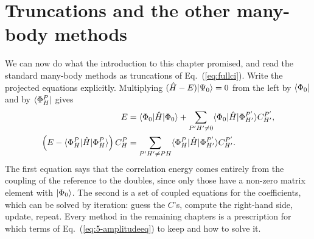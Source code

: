 \section{Truncations and the other many-body methods}
\label{sec:citruncationmap}

We can now do what the introduction to this chapter promised, and read the
standard many-body methods as truncations of Eq.~(\ref{eq:fullci}).  Write the
projected equations explicitly.  Multiplying
$(\hat{H}-E)\vert \Psi_0 \rangle=0$ from the left by $\langle \Phi_0 \vert$ and by
$\langle \Phi_H^P \vert$ gives
\begin{align}
  E &= \langle \Phi_0 | \hat{H} | \Phi_0 \rangle
    + \sum_{P'H'\ne 0}\langle \Phi_0 | \hat{H} | \Phi_{H'}^{P'} \rangle C_{H'}^{P'},
  \label{eq:5-energyeq}\\
  \left(E - \langle \Phi_H^P | \hat{H} | \Phi_H^P \rangle\right)C_H^P
   &= \sum_{P'H'\ne PH}
      \langle \Phi_H^P | \hat{H} | \Phi_{H'}^{P'} \rangle C_{H'}^{P'} .
  \label{eq:5-amplitudeeq}
\end{align}
The first equation says that the correlation energy comes entirely from the
coupling of the reference to the doubles, since only those have a non-zero
matrix element with $\vert \Phi_0 \rangle$.  The second is a set of coupled
equations for the coefficients, which can be solved by iteration: guess the
$C$'s, compute the right-hand side, update, repeat.  Every method in the
remaining chapters is a prescription for which terms of
Eq.~(\ref{eq:5-amplitudeeq}) to keep and how to solve it.

